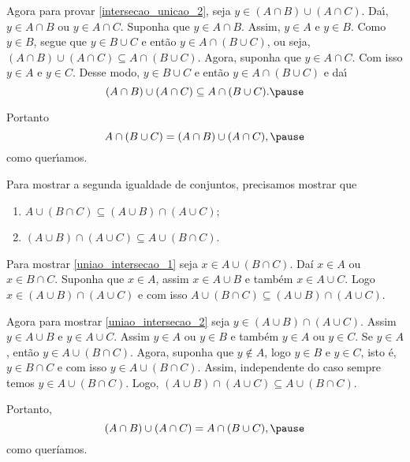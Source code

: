 \documentclass{beamer}
\begin{document}
    \begin{frame}
        Agora para provar \ref{intersecao_unicao_2}, \pause seja $y \in (A \cap B) \cup (A \cap C)$. \pause Da{\'\i}, $y \in A\cap B$ \pause ou $y \in A \cap C$. \pause Suponha que $y \in A \cap B$. \pause Assim, $y \in A$ \pause e $y \in B$. \pause Como $y \in B$, \pause segue que $y \in B \cup C$ \pause e ent{\~a}o $y \in A \cap (B \cup C)$, \pause ou seja, $(A \cap B) \cup (A \cap C) \subseteq A \cap (B \cup C)$. \pause Agora, suponha que $y \in A \cap C$. \pause Com isso $y \in A$ \pause e $y \in C$. \pause Desse modo, $y \in B \cup C$ \pause e ent{\~a}o $y \in A \cap (B \cup C)$ \pause e da{\'\i}\pause
        \[
            (A \cap B) \cup (A \cap C) \subseteq A \cap (B \cup C).\pause
        \]

        Portanto
        \[
            A \cap (B \cup C)=(A \cap B) \cup (A \cap C),\pause
        \]
        como quer{\'\i}amos.
    \end{frame}
    \begin{frame}
        Para mostrar a segunda igualdade de conjuntos, precisamos mostrar que\pause
        \begin{enumerate}[label=({\arabic*})]
            \item $A \cup (B \cap C) \subseteq (A \cup B) \cap (A \cup C)$;\label{uniao_intersecao_1}\pause
            \item $(A \cup B) \cap (A \cup C) \subseteq A \cup (B \cap C)$.\label{uniao_intersecao_2}\pause
        \end{enumerate}

        Para mostrar \ref{uniao_intersecao_1} seja $x \in A \cup (B \cap C)$. \pause Daí $x \in A$ \pause ou $x \in B \cap C$. \pause Suponha que $x \in A$, \pause assim $x \in A \cup B$ \pause e também $x \in A \cup C$. Logo $x \in (A \cup B) \cap (A \cup C)$ \pause e com isso $A \cup (B \cap C) \subseteq (A \cup B) \cap (A \cup C)$.\pause

        Agora para mostrar \ref{uniao_intersecao_2} seja $y \in (A \cup B) \cap (A \cup C)$. \pause Assim $y \in A \cup B$ \pause e $y \in A \cup C$. \pause Assim $y \in A$ \pause ou $y \in B$ \pause e também $y \in A$ \pause ou $y \in C$. \pause Se $y \in A$, \pause então $y \in A \cup (B \cap C)$. Agora, suponha que $y \notin A$, \pause logo $y \in B$ e $y \in C$, \pause isto é, $y \in B \cap C$ e com isso $y \in A \cup (B \cap C)$. Assim, \pause independente do caso sempre temos $y \in A \cup (B \cap C)$. \pause Logo, $(A \cup B) \cap (A \cup C) \subseteq A \cup (B \cap C)$.\pause

        Portanto,\pause
        \[
            (A\cap B)\cup(A\cap C) = A\cap(B\cup C),\pause
        \]
        como queríamos. \qedsymbol \pause 
    \end{frame}
\end{document}
